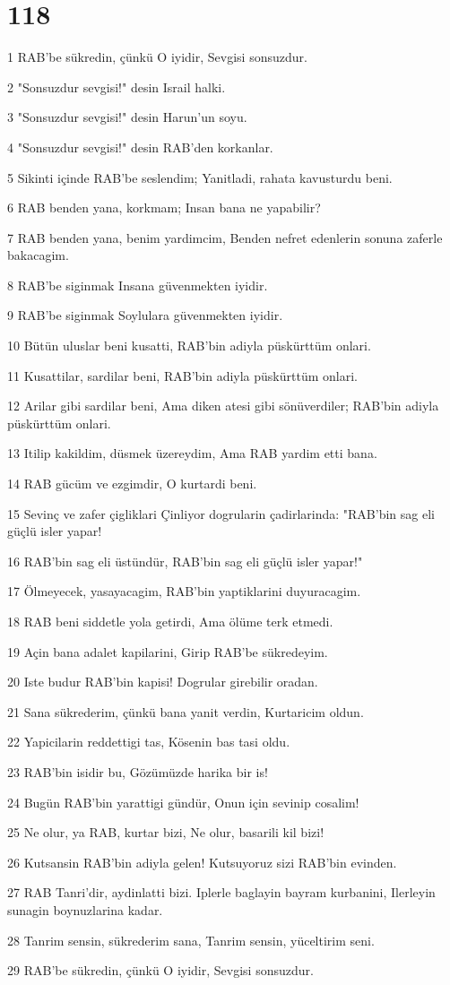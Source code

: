\chapter{118}

\par 1 RAB'be sükredin, çünkü O iyidir, Sevgisi sonsuzdur.
\par 2 "Sonsuzdur sevgisi!" desin Israil halki.
\par 3 "Sonsuzdur sevgisi!" desin Harun'un soyu.
\par 4 "Sonsuzdur sevgisi!" desin RAB'den korkanlar.
\par 5 Sikinti içinde RAB'be seslendim; Yanitladi, rahata kavusturdu beni.
\par 6 RAB benden yana, korkmam; Insan bana ne yapabilir?
\par 7 RAB benden yana, benim yardimcim, Benden nefret edenlerin sonuna zaferle bakacagim.
\par 8 RAB'be siginmak Insana güvenmekten iyidir.
\par 9 RAB'be siginmak Soylulara güvenmekten iyidir.
\par 10 Bütün uluslar beni kusatti, RAB'bin adiyla püskürttüm onlari.
\par 11 Kusattilar, sardilar beni, RAB'bin adiyla püskürttüm onlari.
\par 12 Arilar gibi sardilar beni, Ama diken atesi gibi sönüverdiler; RAB'bin adiyla püskürttüm onlari.
\par 13 Itilip kakildim, düsmek üzereydim, Ama RAB yardim etti bana.
\par 14 RAB gücüm ve ezgimdir, O kurtardi beni.
\par 15 Sevinç ve zafer çigliklari Çinliyor dogrularin çadirlarinda: "RAB'bin sag eli güçlü isler yapar!
\par 16 RAB'bin sag eli üstündür, RAB'bin sag eli güçlü isler yapar!"
\par 17 Ölmeyecek, yasayacagim, RAB'bin yaptiklarini duyuracagim.
\par 18 RAB beni siddetle yola getirdi, Ama ölüme terk etmedi.
\par 19 Açin bana adalet kapilarini, Girip RAB'be sükredeyim.
\par 20 Iste budur RAB'bin kapisi! Dogrular girebilir oradan.
\par 21 Sana sükrederim, çünkü bana yanit verdin, Kurtaricim oldun.
\par 22 Yapicilarin reddettigi tas, Kösenin bas tasi oldu.
\par 23 RAB'bin isidir bu, Gözümüzde harika bir is!
\par 24 Bugün RAB'bin yarattigi gündür, Onun için sevinip cosalim!
\par 25 Ne olur, ya RAB, kurtar bizi, Ne olur, basarili kil bizi!
\par 26 Kutsansin RAB'bin adiyla gelen! Kutsuyoruz sizi RAB'bin evinden.
\par 27 RAB Tanri'dir, aydinlatti bizi. Iplerle baglayin bayram kurbanini, Ilerleyin sunagin boynuzlarina kadar.
\par 28 Tanrim sensin, sükrederim sana, Tanrim sensin, yüceltirim seni.
\par 29 RAB'be sükredin, çünkü O iyidir, Sevgisi sonsuzdur.

